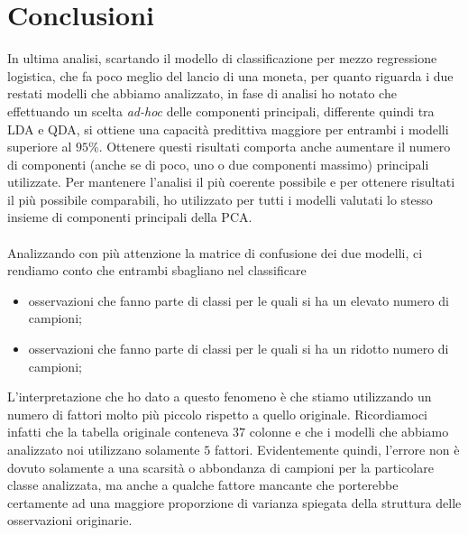 \documentclass[11pt,a4paper]{article}
\begin{document}
\section{Conclusioni}
In ultima analisi, scartando il modello di classificazione per mezzo regressione
logistica, che fa poco meglio del lancio di una moneta, per quanto riguarda i
due restati modelli che abbiamo analizzato, in fase di analisi ho notato che
effettuando un scelta \textit{ad-hoc} delle componenti principali, differente
quindi tra LDA e QDA, si ottiene una capacit\`a predittiva maggiore per entrambi
i modelli superiore al $95\%$. Ottenere questi risultati comporta anche
aumentare il numero di componenti (anche se di poco, uno o due componenti
massimo) principali utilizzate. Per mantenere l'analisi il pi\`u coerente
possibile e per ottenere risultati il pi\`u possibile comparabili, ho utilizzato
per tutti i modelli valutati lo stesso insieme di componenti principali
della PCA.\\
\\
Analizzando con pi\`u attenzione la matrice di confusione dei due modelli, ci
rendiamo conto che entrambi sbagliano nel classificare
\begin{itemize}
	\item osservazioni che fanno parte di classi per le quali si ha un
		elevato numero di campioni;
	\item osservazioni che fanno parte di classi per le quali si ha un
		ridotto numero di campioni;
\end{itemize}
L'interpretazione che ho dato a questo fenomeno \`e che stiamo utilizzando un
numero di fattori molto pi\`u piccolo rispetto a quello originale. Ricordiamoci
infatti che la tabella originale conteneva $37$ colonne e che i modelli che
abbiamo analizzato noi utilizzano solamente $5$ fattori. Evidentemente quindi,
l'errore non \`e dovuto solamente a una scarsit\`a o abbondanza di campioni per
la particolare classe analizzata, ma anche a qualche fattore mancante che
porterebbe certamente ad una maggiore proporzione di varianza spiegata della
struttura delle osservazioni originarie.
\end{document}
